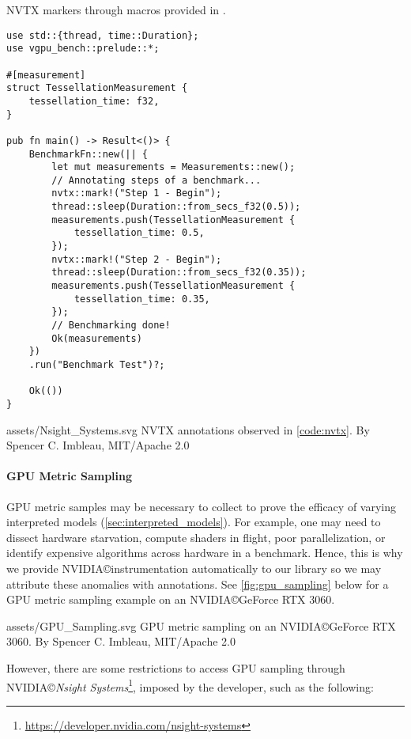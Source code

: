 \begin{snippet}
\caption{NVTX markers through macros provided in \toollinkedname.}\label{code:nvtx}
\begin{verbatim}
use std::{thread, time::Duration};
use vgpu_bench::prelude::*;

#[measurement]
struct TessellationMeasurement {
    tessellation_time: f32,
}

pub fn main() -> Result<()> {
    BenchmarkFn::new(|| {
        let mut measurements = Measurements::new();
        // Annotating steps of a benchmark...
        nvtx::mark!("Step 1 - Begin");
        thread::sleep(Duration::from_secs_f32(0.5));
        measurements.push(TessellationMeasurement {
            tessellation_time: 0.5,
        });
        nvtx::mark!("Step 2 - Begin");
        thread::sleep(Duration::from_secs_f32(0.35));
        measurements.push(TessellationMeasurement {
            tessellation_time: 0.35,
        });
        // Benchmarking done!
        Ok(measurements)
    })
    .run("Benchmark Test")?;

    Ok(())
}
\end{verbatim}
\end{snippet}

\widesvg
{assets/Nsight_Systems.svg}
{NVTX annotations observed in \cref{code:nvtx}.\label{fig:sampling}}
{By Spencer C. Imbleau, MIT/Apache 2.0}
\medskip

\paragraph{GPU Metric Sampling}
GPU metric samples may be necessary to collect to prove the efficacy of varying interpreted models (\cref{sec:interpreted_models}). For example, one may need to dissect hardware starvation, compute shaders in flight, poor parallelization, or identify expensive algorithms across hardware in a benchmark. Hence, this is why we provide NVIDIA\copyright instrumentation automatically to our library so we may attribute these anomalies with annotations. See \cref{fig:gpu_sampling} below for a GPU metric sampling example on an NVIDIA\copyright GeForce RTX 3060.

\widesvg
{assets/GPU_Sampling.svg}
{GPU metric sampling on an NVIDIA\copyright GeForce RTX 3060.\label{fig:gpu_sampling}}
{By Spencer C. Imbleau, MIT/Apache 2.0}
\medskip

However, there are some restrictions to access GPU sampling through NVIDIA\copyright \textit{Nsight Systems}\footnote{\href{https://developer.nvidia.com/nsight-systems}{https://developer.nvidia.com/nsight-systems}}, imposed by the developer, such as the following:


